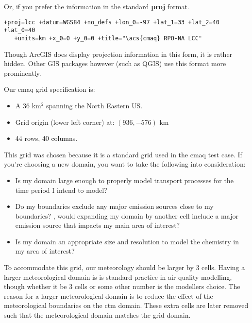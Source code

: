 Or, if you prefer the information in the standard \textbf{proj} format.
\begin{verbatim}
+proj=lcc +datum=WGS84 +no_defs +lon_0=-97 +lat_1=33 +lat_2=40 +lat_0=40
   +units=km +x_0=0 +y_0=0 +title="\acs{cmaq} RPO-NA LCC"
\end{verbatim}
Though ArcGIS does display projection information in this form, it
is rather hidden.  Other GIS packages however (such as QGIS) use this
format more prominently.


Our \ac{cmaq} grid specification is:
\begin{itemize}
	\item A 36 km$^2$ spanning the North Eastern US.
	\item Grid origin (lower left corner) at: $(936, -576) \text{ km}$
	\item 44 rows, 40 columns.
\end{itemize}

This grid was chosen because it is a standard grid used in the
\acs{cmaq} test case.  If you're choosing a new domain, you want to
take the following into consideration:
\begin{itemize}
	\item Is my domain large enough to properly model transport processes for the time period I intend to model?
	\item Do my boundaries exclude any major emission sources close to my boundaries? \ie, would expanding my domain by another cell include a major emission source that impacts my main area of interest?
	\item Is my domain an appropriate size and resolution to model the chemistry in my area of interest?
\end{itemize}

To accommodate this grid, our meteorology should be larger by 3
cells.  Having a larger meteorological domain is is standard practice in air
quality modelling, though whether it be 3 cells or some other number is the
modellers choice.  The reason for a larger meteorological domain is to reduce
the effect of the meteorological boundaries on the \ac{ctm} domain.  These
extra cells are later removed such that the meteorological domain matches the
grid domain.

